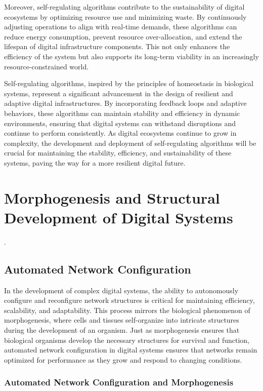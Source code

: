 \documentclass[12pt,twoside]{article}
\begin{document}
Moreover, self-regulating algorithms contribute to the sustainability of digital ecosystems by optimizing resource use and minimizing waste. By continuously adjusting operations to align with real-time demands, these algorithms can reduce energy consumption, prevent resource over-allocation, and extend the lifespan of digital infrastructure components. This not only enhances the efficiency of the system but also supports its long-term viability in an increasingly resource-constrained world.

Self-regulating algorithms, inspired by the principles of homeostasis in biological systems, represent a significant advancement in the design of resilient and adaptive digital infrastructures. By incorporating feedback loops and adaptive behaviors, these algorithms can maintain stability and efficiency in dynamic environments, ensuring that digital systems can withstand disruptions and continue to perform consistently. As digital ecosystems continue to grow in complexity, the development and deployment of self-regulating algorithms will be crucial for maintaining the stability, efficiency, and sustainability of these systems, paving the way for a more resilient digital future.


\section{Morphogenesis and Structural Development of Digital Systems}.

\subsection{Automated Network Configuration}

In the development of complex digital systems, the ability to autonomously configure and reconfigure network structures is critical for maintaining efficiency, scalability, and adaptability. This process mirrors the biological phenomenon of morphogenesis, where cells and tissues self-organize into intricate structures during the development of an organism. Just as morphogenesis ensures that biological organisms develop the necessary structures for survival and function, automated network configuration in digital systems ensures that networks remain optimized for performance as they grow and respond to changing conditions.

\subsubsection{Automated Network Configuration and Morphogenesis}
\end{document}
